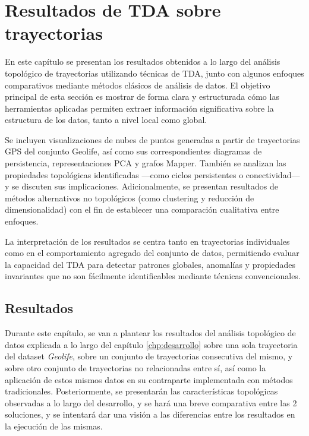 \chapter{Resultados de TDA sobre trayectorias} \label{chp:resultados}
En este capítulo se presentan los resultados obtenidos a lo largo del análisis topológico de trayectorias utilizando técnicas de TDA, junto con algunos enfoques comparativos mediante métodos clásicos de análisis de datos. El objetivo principal de esta sección es mostrar de forma clara y estructurada cómo las herramientas aplicadas permiten extraer información significativa sobre la estructura de los datos, tanto a nivel local como global.

\vspace{0.2cm}

Se incluyen visualizaciones de nubes de puntos generadas a partir de trayectorias GPS del conjunto Geolife, así como sus correspondientes diagramas de persistencia, representaciones PCA y grafos Mapper. También se analizan las propiedades topológicas identificadas —como ciclos persistentes o conectividad— y se discuten sus implicaciones. Adicionalmente, se presentan resultados de métodos alternativos no topológicos (como clustering y reducción de dimensionalidad) con el fin de establecer una comparación cualitativa entre enfoques.

\vspace{0.2cm}

La interpretación de los resultados se centra tanto en trayectorias individuales como en el comportamiento agregado del conjunto de datos, permitiendo evaluar la capacidad del TDA para detectar patrones globales, anomalías y propiedades invariantes que no son fácilmente identificables mediante técnicas convencionales.


\section{Resultados} \label{sct:resultados_resultados}

Durante este capítulo, se van a plantear los resultados del análisis topológico de datos explicada a lo largo del capítulo \ref{chp:desarrollo} sobre una sola trayectoria del dataset \textit{Geolife}, sobre un conjunto de trayectorias consecutiva del mismo, y sobre otro conjunto de trayectorias no relacionadas entre sí, así como la aplicación de estos mismos datos en su contraparte implementada con métodos tradicionales. Posteriormente, se presentarán las características topológicas observadas a lo largo del desarrollo, y se hará una breve comparativa entre las 2 soluciones, y se intentará dar una visión a las diferencias entre los resultados en la ejecución de las mismas.

